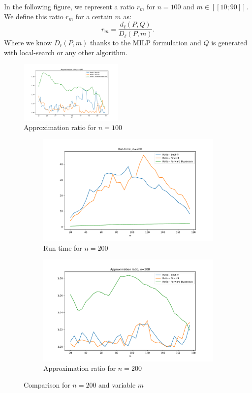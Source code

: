 \documentclass{amsart}
\begin{document}
In the following figure, we represent a ratio $r_m$ for $n=100$ and $m\in [\![10;90]\!]$. We define this ratio $r_m$ for a certain $m$ as: 
$$
r_m = \frac{d_\ell\left(P,Q\right)}{D_\ell\left(P,m\right)}.
$$
Where we know $D_\ell\left(P,m\right)$ thanks to the MILP formulation and $Q$ is generated with local-search or any other algorithm.

\begin{figure}[ht]
    \centering
    \includegraphics[width=0.45\textwidth]{plots/ratio with milp.pdf}
    \caption{Approximation ratio for $n=100$}
\end{figure}
    
\begin{figure}[ht]
    \centering
    \begin{subfigure}[b]{0.45\textwidth}
        \centering
        \includegraphics[width=\textwidth]{plots/run time 200.pdf}
        \caption{Run time for $n=200$}
    \end{subfigure}
    \hfill
    \begin{subfigure}[b]{0.45\textwidth}
        \centering
        \includegraphics[width=\textwidth]{plots/ratio 200.pdf}
        \caption{Approximation ratio for $n=200$}
    \end{subfigure}
    \caption{Comparison for $n=200$ and variable $m$}
    \label{improvement ratio }
\end{figure}
\end{document}

